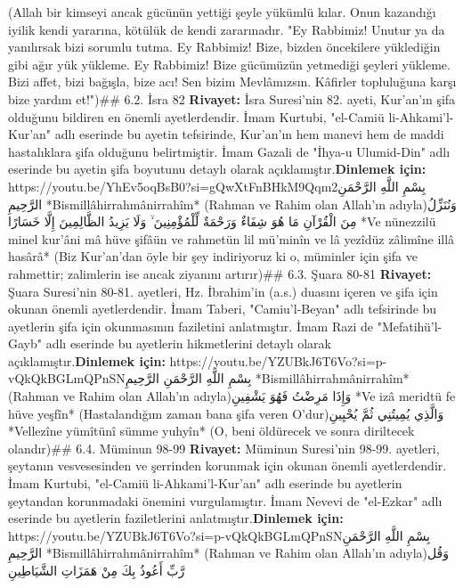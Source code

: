 \documentclass[12pt,a4paper]{article}
\begin{document}
{(Allah bir kimseyi ancak gücünün yettiği şeyle yükümlü kılar. Onun kazandığı iyilik kendi yararına, kötülük de kendi zararınadır. "Ey Rabbimiz! Unutur ya da yanılırsak bizi sorumlu tutma. Ey Rabbimiz! Bize, bizden öncekilere yüklediğin gibi ağır yük yükleme. Ey Rabbimiz! Bize gücümüzün yetmediği şeyleri yükleme. Bizi affet, bizi bağışla, bize acı! Sen bizim Mevlâmızsın. Kâfirler topluluğuna karşı bize yardım et!")\#\# 6.2. İsra 82
\textbf{Rivayet:} İsra Suresi'nin 82. ayeti, Kur'an'ın şifa olduğunu bildiren en önemli ayetlerdendir. İmam Kurtubi, "el-Camiü li-Ahkami'l-Kur'an" adlı eserinde bu ayetin tefsirinde, Kur'an'ın hem manevi hem de maddi hastalıklara şifa olduğunu belirtmiştir. İmam Gazali de "İhya-u Ulumid-Din" adlı eserinde bu ayetin şifa boyutunu detaylı olarak açıklamıştır.\textbf{Dinlemek için:} https://youtu.be/YhEv5oqBsB0?si=gQwXtFnBHkM9Qqm2بِسْمِ اللَّهِ الرَّحْمَنِ الرَّحِيمِ
*Bismillâhirrahmânirrahîm*
(Rahman ve Rahim olan Allah'ın adıyla)وَنُنَزِّلُ مِنَ الْقُرْآنِ مَا هُوَ شِفَاءٌ وَرَحْمَةٌ لِّلْمُؤْمِنِينَ ۙ وَلَا يَزِيدُ الظَّالِمِينَ إِلَّا خَسَارًا
*Ve nünezzilü minel kur'âni mâ hüve şifâün ve rahmetün lil mü'minîn ve lâ yezîdüz zâlimîne illâ hasârâ*
(Biz Kur'an'dan öyle bir şey indiriyoruz ki o, müminler için şifa ve rahmettir; zalimlerin ise ancak ziyanını artırır)\#\# 6.3. Şuara 80-81
\textbf{Rivayet:} Şuara Suresi'nin 80-81. ayetleri, Hz. İbrahim'in (a.s.) duasını içeren ve şifa için okunan önemli ayetlerdendir. İmam Taberi, "Camiu'l-Beyan" adlı tefsirinde bu ayetlerin şifa için okunmasının faziletini anlatmıştır. İmam Razi de "Mefatihü'l-Gayb" adlı eserinde bu ayetlerin hikmetlerini detaylı olarak açıklamıştır.\textbf{Dinlemek için:} https://youtu.be/YZUBkJ6T6Vo?si=p-vQkQkBGLmQPnSNبِسْمِ اللَّهِ الرَّحْمَنِ الرَّحِيمِ
*Bismillâhirrahmânirrahîm*
(Rahman ve Rahim olan Allah'ın adıyla)وَإِذَا مَرِضْتُ فَهُوَ يَشْفِينِ
*Ve izâ meridtü fe hüve yeşfîn*
(Hastalandığım zaman bana şifa veren O'dur)وَالَّذِي يُمِيتُنِي ثُمَّ يُحْيِينِ
*Vellezîne yümîtünî sümme yuhyîn*
(O, beni öldürecek ve sonra diriltecek olandır)\#\# 6.4. Müminun 98-99
\textbf{Rivayet:} Müminun Suresi'nin 98-99. ayetleri, şeytanın vesvesesinden ve şerrinden korunmak için okunan önemli ayetlerdendir. İmam Kurtubi, "el-Camiü li-Ahkami'l-Kur'an" adlı eserinde bu ayetlerin şeytandan korunmadaki önemini vurgulamıştır. İmam Nevevi de "el-Ezkar" adlı eserinde bu ayetlerin faziletlerini anlatmıştır.\textbf{Dinlemek için:} https://youtu.be/YZUBkJ6T6Vo?si=p-vQkQkBGLmQPnSNبِسْمِ اللَّهِ الرَّحْمَنِ الرَّحِيمِ
*Bismillâhirrahmânirrahîm*
(Rahman ve Rahim olan Allah'ın adıyla)وَقُل رَّبِّ أَعُوذُ بِكَ مِنْ هَمَزَاتِ الشَّيَاطِينِ
}
\end{document}

